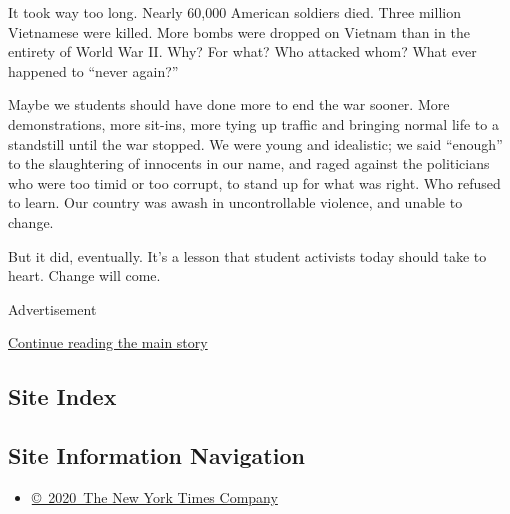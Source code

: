 It took way too long. Nearly 60,000 American soldiers died. Three
million Vietnamese were killed. More bombs were dropped on Vietnam than
in the entirety of World War II. Why? For what? Who attacked whom? What
ever happened to ``never again?''

Maybe we students should have done more to end the war sooner. More
demonstrations, more sit-ins, more tying up traffic and bringing normal
life to a standstill until the war stopped. We were young and
idealistic; we said ``enough'' to the slaughtering of innocents in our
name, and raged against the politicians who were too timid or too
corrupt, to stand up for what was right. Who refused to learn. Our
country was awash in uncontrollable violence, and unable to change.

But it did, eventually. It's a lesson that student activists today
should take to heart. Change will come.

Advertisement

\protect\hyperlink{after-bottom}{Continue reading the main story}

\hypertarget{site-index}{%
\subsection{Site Index}\label{site-index}}

\hypertarget{site-information-navigation}{%
\subsection{Site Information
Navigation}\label{site-information-navigation}}

\begin{itemize}
\tightlist
\item
  \href{https://help.nytimes3xbfgragh.onion/hc/en-us/articles/115014792127-Copyright-notice}{©~2020~The
  New York Times Company}
\end{itemize}

